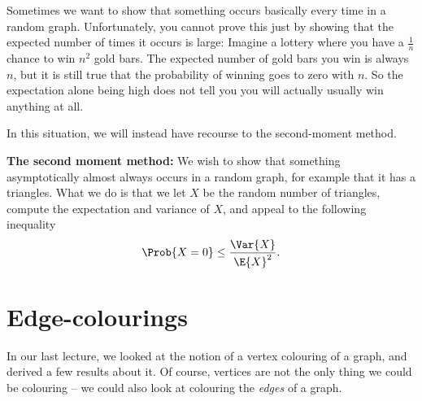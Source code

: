 \documentclass[nobib]{tufte-handout}
\begin{document}
Sometimes we want to show that something occurs basically every time in a random graph. Unfortunately, you cannot prove this just by showing that the expected number of times it occurs is large: Imagine a lottery where you have a $\frac{1}{n}$ chance to win $n^2$ gold bars. The expected number of gold bars you win is always $n$, but it is still true that the probability of winning goes to zero with $n$. So the expectation alone being high does not tell you you will actually usually win anything at all.

In this situation, we will instead have recourse to the second-moment method.

\textbf{The second moment method:} We wish to show that something asymptotically almost always occurs in a random graph, for example that it has a triangles. What we do is that we let $X$ be the random number of triangles, compute the expectation and variance of $X$, and appeal to the following inequality
$$\Prob{X = 0} \leq \frac{\Var{X}}{\E{X}^2}.$$

\section{Edge-colourings}

In our last lecture, we looked at the notion of a vertex colouring of a graph, and derived a few results about it. Of course, vertices are not the only thing we could be colouring -- we could also look at colouring the \emph{edges} of a graph.
\end{document}
